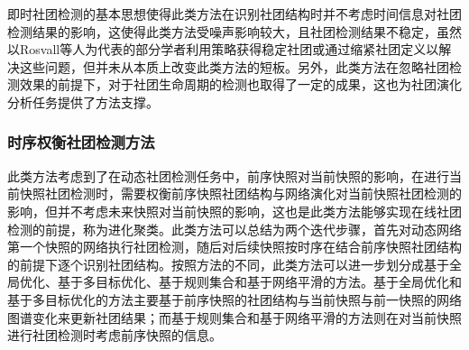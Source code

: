 即时社团检测的基本思想使得此类方法在识别社团结构时并不考虑时间信息对社团检测结果的影响，这使得此类方法受噪声影响较大，且社团检测结果不稳定，虽然以Rosvall等人\cite{holmgren2023mapping}为代表的部分学者利用策略获得稳定社团或通过缩紧社团定义以解决这些问题，但并未从本质上改变此类方法的短板。另外，此类方法在忽略社团检测效果的前提下，对于社团生命周期的检测也取得了一定的成果\cite{chen2010detecting}，这也为社团演化分析任务提供了方法支撑。
\subsubsection{时序权衡社团检测方法}
此类方法考虑到了在动态社团检测任务中，前序快照对当前快照的影响，在进行当前快照社团检测时，需要权衡前序快照社团结构与网络演化对当前快照社团检测的影响，但并不考虑未来快照对当前快照的影响，这也是此类方法能够实现在线社团检测的前提，称为进化聚类。此类方法可以总结为两个迭代步骤，首先对动态网络第一个快照的网络执行社团检测，随后对后续快照按时序在结合前序快照社团结构的前提下逐个识别社团结构。按照方法的不同，此类方法可以进一步划分成基于全局优化、基于多目标优化、基于规则集合和基于网络平滑的方法。基于全局优化和基于多目标优化的方法主要基于前序快照的社团结构与当前快照与前一快照的网络图谱变化来更新社团结果；而基于规则集合和基于网络平滑的方法则在对当前快照进行社团检测时考虑前序快照的信息。

